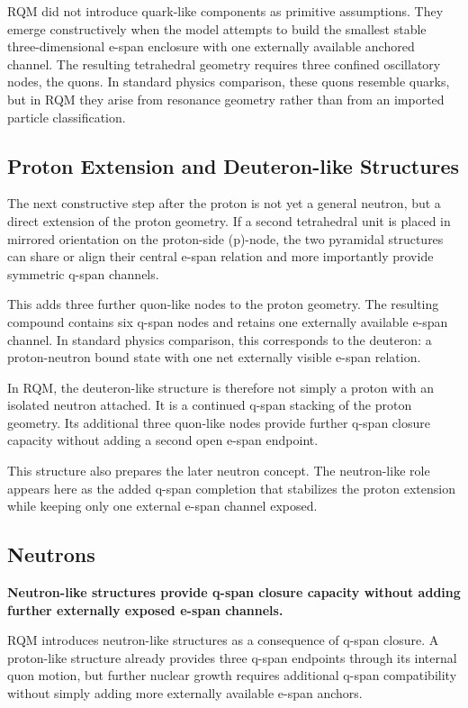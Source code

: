 \documentclass[11pt,a4paper]{article}
\begin{document}
RQM did not introduce quark-like components as primitive assumptions. They emerge constructively when the model attempts to build the smallest stable three-dimensional e-span enclosure with one externally available anchored channel. The resulting tetrahedral geometry requires three confined oscillatory nodes, the quons. In standard physics comparison, these quons resemble quarks, but in RQM they arise from resonance geometry rather than from an imported particle classification.


\subsection{Proton Extension and Deuteron-like Structures}

The next constructive step after the proton is not yet a general neutron, but a direct extension of the proton geometry. If a second tetrahedral unit is placed in mirrored orientation on the proton-side (p)-node, the two pyramidal structures can share or align their central e-span relation and more importantly provide symmetric q-span channels.

This adds three further quon-like nodes to the proton geometry. The resulting compound contains six q-span nodes and retains one externally available e-span channel. In standard physics comparison, this corresponds to the deuteron: a proton-neutron bound state with one net externally visible e-span relation.

In RQM, the deuteron-like structure is therefore not simply a proton with an isolated neutron attached. It is a continued q-span stacking of the proton geometry. Its additional three quon-like nodes provide further q-span closure capacity without adding a second open e-span endpoint.

This structure also prepares the later neutron concept. The neutron-like role appears here as the added q-span completion that stabilizes the proton extension while keeping only one external e-span channel exposed.

\subsection{Neutrons}

\textbf{Neutron-like structures provide q-span closure capacity without adding further externally exposed e-span channels.}

RQM introduces neutron-like structures as a consequence of q-span closure. A proton-like structure already provides three q-span endpoints through its internal quon motion, but further nuclear growth requires additional q-span compatibility without simply adding more externally available e-span anchors.
\end{document}
